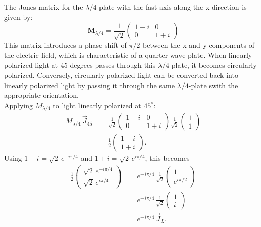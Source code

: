 The Jones matrix for the $\lambda/4$-plate with the fast axis along the x-direction is given by:
\begin{equation*}
\mathbf{M}_{\lambda/4} = \frac{1}{\sqrt{2}}
\begin{pmatrix} 1-i & 0 \\
 0 & 1 + i \end{pmatrix}
\end{equation*}
This matrix introduces a phase shift of $\pi/2$ between the x and y components of the electric field, which is characteristic of a quarter-wave plate.
When linearly polarized light at 45 degrees passes through this $\lambda/4$-plate, it becomes circularly polarized.
Conversely, circularly polarized light can be converted back into linearly polarized light by passing it through the same $\lambda/4$-plate
swith the appropriate orientation.\\
Applying $M_{\lambda/4}$ to light linearly polarized at $45^\circ$:
\begin{equation}
    \begin{split}
    M_{\lambda/4}\,\vec{J}_{45}
    &= \frac{1}{\sqrt{2}}
    \begin{pmatrix} 1-i & 0 \\ 0 & 1+i \end{pmatrix}
    \frac{1}{\sqrt{2}}\begin{pmatrix} 1 \\ 1 \end{pmatrix}\\
    &= \frac{1}{2}\begin{pmatrix} 1-i \\ 1+i \end{pmatrix}.
    \end{split}
\end{equation}
Using $1-i = \sqrt{2}\,e^{-i\pi/4}$ and $1+i = \sqrt{2}\,e^{i\pi/4}$, this
becomes
\begin{equation}
    \begin{split}
    \frac{1}{2}\begin{pmatrix} \sqrt{2}\,e^{-i\pi/4} \\ \sqrt{2}\,e^{i\pi/4} \end{pmatrix}
    &= e^{-i\pi/4}\,\frac{1}{\sqrt{2}}\begin{pmatrix} 1 \\ e^{i\pi/2} \end{pmatrix}\\
    &= e^{-i\pi/4}\,\frac{1}{\sqrt{2}}\begin{pmatrix} 1 \\ i \end{pmatrix}\\
    &= e^{-i\pi/4}\,\vec{J}_L.
    \end{split}
\end{equation}

